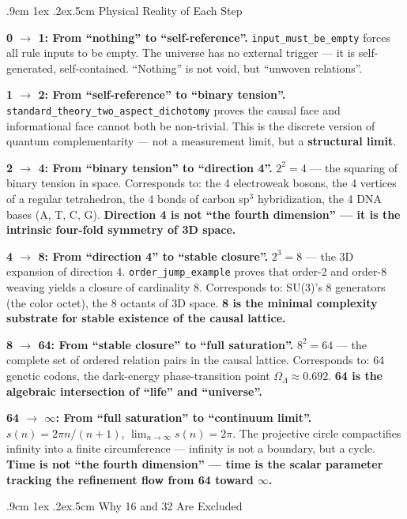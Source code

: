 \documentclass[aps,prd,twocolumn,nofootinbib,floatfix]{revtex4-2}
\makeatletter
\def\subsection{%
  \@startsection{subsection}{2}{\z@}
    {.9cm \@plus1ex \@minus .2ex}{.5cm}
    {\normalfont\normalsize\bfseries\centering}%
}
\makeatother
\begin{document}
\subsection{Physical Reality of Each Step}

\textbf{0 $\to$ 1: From ``nothing'' to ``self-reference''.} \texttt{input\_must\_be\_empty} forces all rule inputs to be empty. The universe has no external trigger --- it is self-generated, self-contained. ``Nothing'' is not void, but ``unwoven relations''.

\textbf{1 $\to$ 2: From ``self-reference'' to ``binary tension''.} \texttt{standard\_theory\_two\_aspect\_dichotomy} proves the causal face and informational face cannot both be non-trivial. This is the discrete version of quantum complementarity --- not a measurement limit, but a \textbf{structural limit}.

\textbf{2 $\to$ 4: From ``binary tension'' to ``direction 4''.} $2^2 = 4$ --- the squaring of binary tension in space. Corresponds to: the 4 electroweak bosons, the 4 vertices of a regular tetrahedron, the 4 bonds of carbon sp$^3$ hybridization, the 4 DNA bases (A, T, C, G). \textbf{Direction 4 is not ``the fourth dimension'' --- it is the intrinsic four-fold symmetry of 3D space.}

\textbf{4 $\to$ 8: From ``direction 4'' to ``stable closure''.} $2^3 = 8$ --- the 3D expansion of direction 4. \texttt{order\_jump\_example} proves that order-2 and order-8 weaving yields a closure of cardinality 8. Corresponds to: SU(3)'s 8 generators (the color octet), the 8 octants of 3D space. \textbf{8 is the minimal complexity substrate for stable existence of the causal lattice.}

\textbf{8 $\to$ 64: From ``stable closure'' to ``full saturation''.} $8^2 = 64$ --- the complete set of ordered relation pairs in the causal lattice. Corresponds to: 64 genetic codons, the dark-energy phase-transition point $\Omega_\Lambda \approx 0.692$. \textbf{64 is the algebraic intersection of ``life'' and ``universe''.}

\textbf{64 $\to$ $\infty$: From ``full saturation'' to ``continuum limit''.} $s(n) = 2\pi n/(n+1)$, $\lim_{n\to\infty} s(n) = 2\pi$. The projective circle compactifies infinity into a finite circumference --- infinity is not a boundary, but a cycle. \textbf{Time is not ``the fourth dimension'' --- time is the scalar parameter tracking the refinement flow from 64 toward $\infty$.}

\subsection{Why 16 and 32 Are Excluded}
\end{document}
